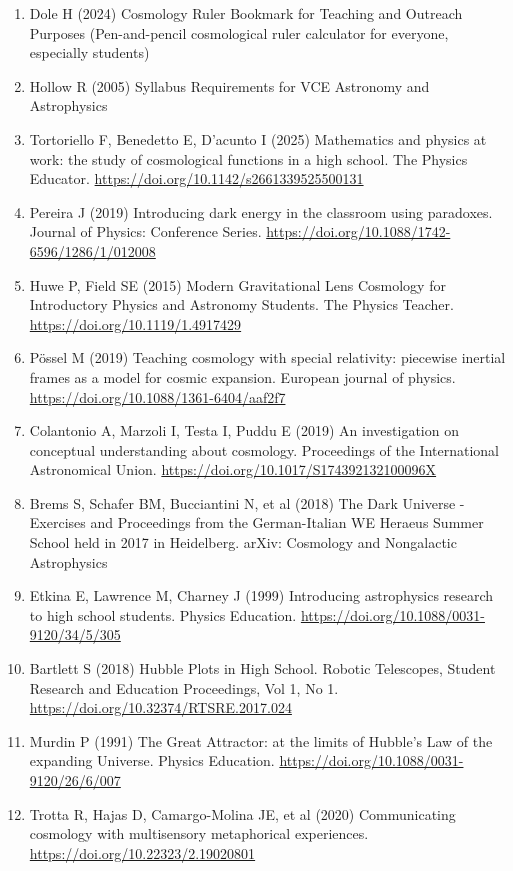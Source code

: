 {\begin{enumerate}
\item Dole H (2024) Cosmology Ruler Bookmark for Teaching and Outreach Purposes (Pen-and-pencil cosmological ruler calculator for everyone, especially students)
\item Hollow R (2005) Syllabus Requirements for VCE Astronomy and Astrophysics
\item Tortoriello F, Benedetto E, D'acunto I (2025) Mathematics and physics at work: the study of cosmological functions in a high school. The Physics Educator. \url{https://doi.org/10.1142/s2661339525500131}
\item Pereira J (2019) Introducing dark energy in the classroom using paradoxes. Journal of Physics: Conference Series. \url{https://doi.org/10.1088/1742-6596/1286/1/012008}
\item Huwe P, Field SE (2015) Modern Gravitational Lens Cosmology for Introductory Physics and Astronomy Students. The Physics Teacher. \url{https://doi.org/10.1119/1.4917429}
\item Pössel M (2019) Teaching cosmology with special relativity: piecewise inertial frames as a model for cosmic expansion. European journal of physics. \url{https://doi.org/10.1088/1361-6404/aaf2f7}
\item Colantonio A, Marzoli I, Testa I, Puddu E (2019) An investigation on conceptual understanding about cosmology. Proceedings of the International Astronomical Union. \url{https://doi.org/10.1017/S174392132100096X}
\item Brems S, Schafer BM, Bucciantini N, et al (2018) The Dark Universe - Exercises and Proceedings from the German-Italian WE Heraeus Summer School held in 2017 in Heidelberg. arXiv: Cosmology and Nongalactic Astrophysics
\item Etkina E, Lawrence M, Charney J (1999) Introducing astrophysics research to high school students. Physics Education. \url{https://doi.org/10.1088/0031-9120/34/5/305}
\item Bartlett S (2018) Hubble Plots in High School. Robotic Telescopes, Student Research and Education Proceedings, Vol 1, No 1. \url{https://doi.org/10.32374/RTSRE.2017.024}
\item Murdin P (1991) The Great Attractor: at the limits of Hubble's Law of the expanding Universe. Physics Education. \url{https://doi.org/10.1088/0031-9120/26/6/007}
\item Trotta R, Hajas D, Camargo-Molina JE, et al (2020) Communicating cosmology with multisensory metaphorical experiences. \url{https://doi.org/10.22323/2.19020801}

\end{enumerate}}
